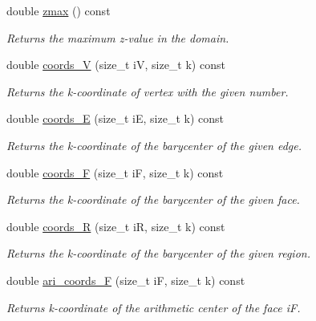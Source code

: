 \begin{DoxyCompactItemize}
\mbox{\label{classStemMesh3D_1_1mesh__3Dv_add032c1260324e57f35537ebf59b5815}} 
double \hyperlink{classStemMesh3D_1_1mesh__3Dv_add032c1260324e57f35537ebf59b5815}{zmax} () const
\begin{DoxyCompactList}\small\item\em Returns the maximum z-\/value in the domain. \end{DoxyCompactList}\item 
double \hyperlink{classStemMesh3D_1_1mesh__3Dv_a29503e2b5f21281a0fd14ec774c1c5da}{coords\+\_\+V} (size\+\_\+t iV, size\+\_\+t k) const
\begin{DoxyCompactList}\small\item\em Returns the k-\/coordinate of vertex with the given number. \end{DoxyCompactList}\item 
double \hyperlink{classStemMesh3D_1_1mesh__3Dv_a10101184cb1bbc5e8b552dc53bb6a832}{coords\+\_\+E} (size\+\_\+t iE, size\+\_\+t k) const
\begin{DoxyCompactList}\small\item\em Returns the k-\/coordinate of the barycenter of the given edge. \end{DoxyCompactList}\item 
double \hyperlink{classStemMesh3D_1_1mesh__3Dv_ac7c814c45152936451a8d5da7606fb76}{coords\+\_\+F} (size\+\_\+t iF, size\+\_\+t k) const
\begin{DoxyCompactList}\small\item\em Returns the k-\/coordinate of the barycenter of the given face. \end{DoxyCompactList}\item 
double \hyperlink{classStemMesh3D_1_1mesh__3Dv_a93c53cc79d88193b65fa5206082720e2}{coords\+\_\+R} (size\+\_\+t iR, size\+\_\+t k) const
\begin{DoxyCompactList}\small\item\em Returns the k-\/coordinate of the barycenter of the given region. \end{DoxyCompactList}\item 
double \hyperlink{classStemMesh3D_1_1mesh__3Dv_a3a20194034b0d98ad894bcad47d57ffe}{ari\+\_\+coords\+\_\+F} (size\+\_\+t iF, size\+\_\+t k) const
\begin{DoxyCompactList}\small\item\em Returns k-\/coordinate of the arithmetic center of the face iF. \end{DoxyCompactList}\item 

\end{DoxyCompactItemize}
